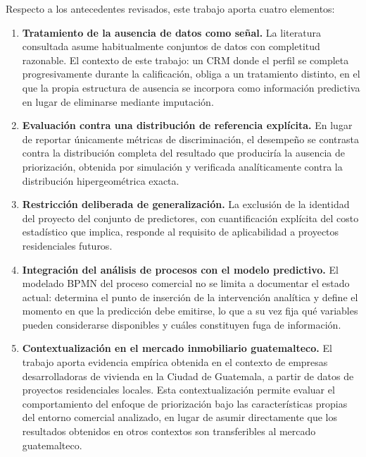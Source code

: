 Respecto a los antecedentes revisados, este trabajo aporta cuatro elementos:

\begin{enumerate}
    \item \textbf{Tratamiento de la ausencia de datos como señal.} La literatura
    consultada asume habitualmente conjuntos de datos con completitud razonable. El
    contexto de este trabajo: un CRM donde el perfil se completa progresivamente
    durante la calificación, obliga a un tratamiento distinto, en el que la propia
    estructura de ausencia se incorpora como información predictiva en lugar de
    eliminarse mediante imputación.
    \item \textbf{Evaluación contra una distribución de referencia explícita.} En
    lugar de reportar únicamente métricas de discriminación, el desempeño se
    contrasta contra la distribución completa del resultado que produciría la
    ausencia de priorización, obtenida por simulación y verificada analíticamente
    contra la distribución hipergeométrica exacta.
    \item \textbf{Restricción deliberada de generalización.} La exclusión de la
    identidad del proyecto del conjunto de predictores, con cuantificación explícita
    del costo estadístico que implica, responde al requisito de aplicabilidad a
    proyectos residenciales futuros.
    \item \textbf{Integración del análisis de procesos con el modelo predictivo.} El
    modelado BPMN del proceso comercial no se limita a documentar el estado actual:
    determina el punto de inserción de la intervención analítica y define el momento
    en que la predicción debe emitirse, lo que a su vez fija qué variables pueden
    considerarse disponibles y cuáles constituyen fuga de información.
    \item \textbf{Contextualización en el mercado inmobiliario guatemalteco.}
    El trabajo aporta evidencia empírica obtenida en el contexto de empresas
    desarrolladoras de vivienda en la Ciudad de Guatemala, a partir de datos de
    proyectos residenciales locales. Esta contextualización permite evaluar el
    comportamiento del enfoque de priorización bajo las características propias
    del entorno comercial analizado, en lugar de asumir directamente que los
    resultados obtenidos en otros contextos son transferibles al mercado
    guatemalteco.
\end{enumerate}
